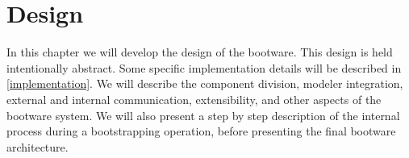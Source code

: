 \chapter{Design}
\label{design}

In this chapter we will develop the design of the bootware.
This design is held intentionally abstract.
Some specific implementation details will be described in \autoref{implementation}.
We will describe the component division, modeler integration, external and internal communication, extensibility, and other aspects of the bootware system.
We will also present a step by step description of the internal process during a bootstrapping operation, before presenting the final bootware architecture.













